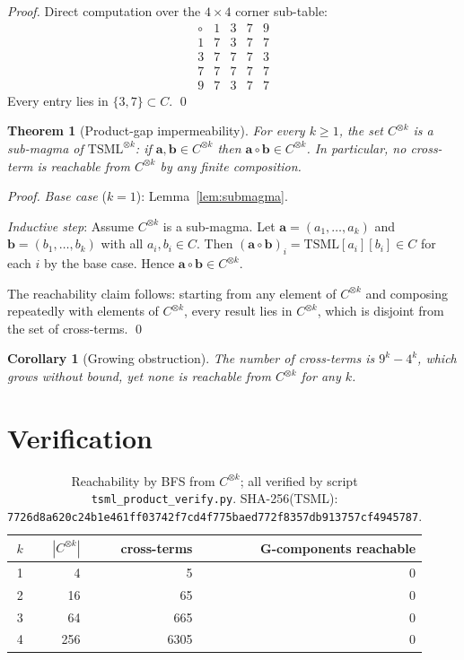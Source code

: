 \documentclass[11pt]{article}
\newtheorem{theorem}{Theorem}
\newtheorem{corollary}{Corollary}
\begin{document}
\begin{proof}
Direct computation over the $4\times4$ corner sub-table:
\[
\begin{array}{c|cccc}
\circ&1&3&7&9\\\hline
1&7&3&7&7\\
3&7&7&7&3\\
7&7&7&7&7\\
9&7&3&7&7
\end{array}
\]
Every entry lies in $\{3,7\}\subset C$. \qed
\end{proof}

\begin{theorem}[Product-gap impermeability]\label{thm:main}
For every $k\ge1$, the set $C^{\otimes k}$ is a sub-magma of
$\mathrm{TSML}^{\otimes k}$: if $\mathbf{a},\mathbf{b}\in C^{\otimes k}$
then $\mathbf{a}\circ\mathbf{b}\in C^{\otimes k}$.
In particular, no cross-term is reachable from $C^{\otimes k}$
by any finite composition.
\end{theorem}

\begin{proof}
\emph{Base case} ($k=1$): Lemma~\ref{lem:submagma}.

\emph{Inductive step}: Assume $C^{\otimes k}$ is a sub-magma.
Let $\mathbf{a}=(a_1,\ldots,a_k)$ and $\mathbf{b}=(b_1,\ldots,b_k)$
with all $a_i,b_i\in C$.
Then $(\mathbf{a}\circ\mathbf{b})_i=\mathrm{TSML}[a_i][b_i]\in C$
for each $i$ by the base case.
Hence $\mathbf{a}\circ\mathbf{b}\in C^{\otimes k}$.

The reachability claim follows: starting from any element of
$C^{\otimes k}$ and composing repeatedly with elements of $C^{\otimes k}$,
every result lies in $C^{\otimes k}$, which is disjoint from the set of
cross-terms. \qed
\end{proof}

\begin{corollary}[Growing obstruction]\label{cor:grow}
The number of cross-terms is
$9^k - 4^k$, which grows without bound, yet none is reachable
from $C^{\otimes k}$ for any $k$.
\end{corollary}

\section{Verification}

\begin{table}[h]
\centering
\begin{tabular}{crrr}
\hline
$k$ & $|C^{\otimes k}|$ & cross-terms & G-components reachable\\
\hline
1 & 4   & 5   & 0\\
2 & 16  & 65  & 0\\
3 & 64  & 665 & 0\\
4 & 256 & 6305 & 0\\
\hline
\end{tabular}
\caption{Reachability by BFS from $C^{\otimes k}$; all verified
by script \texttt{tsml\_product\_verify.py}.
SHA-256(TSML): \texttt{7726d8a620c24b1e461ff03742f7cd4f775baed772f8357db913757cf4945787}.}
\end{table}
\end{document}
